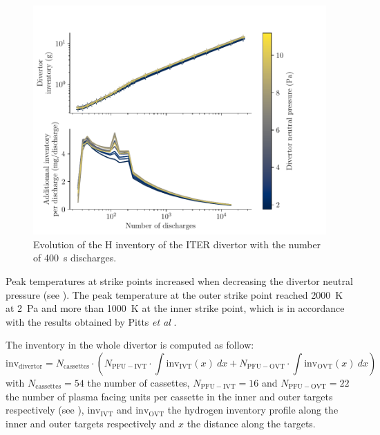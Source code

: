 \begin{figure}[h!]
    \centering
    \includegraphics[width=\linewidth]{Figures/Chapter4/ITER/inventory_vs_time.pdf}
    \caption{Evolution of the H inventory of the ITER divertor with the number of \SI{400}{s} discharges.}
\end{figure}


Peak temperatures at strike points increased when decreasing the divertor neutral pressure (see ).
The peak temperature at the outer strike point reached \SI{2000}{K} at \SI{2}{Pa} and more than \SI{1000}{K} at the inner strike point, which is in accordance with the results obtained by Pitts \textit{et al} .

The inventory in the whole divertor is computed as follow:
\begin{equation}
    \mathrm{inv_{divertor}} = N_\mathrm{cassettes} \cdot \left( N_\mathrm{PFU-IVT} \cdot \int \mathrm{inv_{IVT}}(x)\: dx + N_\mathrm{PFU-OVT} \cdot\int \mathrm{inv_{OVT}}(x) \: dx \right)
\end{equation}
with $N_\mathrm{cassettes}=54$ the number of cassettes, $N_\mathrm{PFU-IVT}=16$ and $N_\mathrm{PFU-OVT}=22$ the number of plasma facing units per cassette in the inner and outer targets respectively (see ), $\mathrm{inv_{IVT}}$ and $\mathrm{inv_{OVT}}$ the hydrogen inventory profile along the inner and outer targets respectively and $x$ the distance along the targets.

